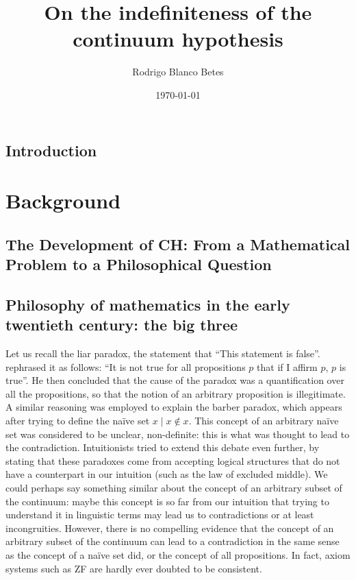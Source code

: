 \documentclass[11pt,a4paper]{book}
\title{\textbf{On the indefiniteness of the continuum hypothesis}}
\author{Rodrigo Blanco Betes}
\date{\today}
\begin{document}
\frontmatter
\maketitle

\tableofcontents

\section*{Introduction}


\mainmatter

\chapter{Background}

\section{The Development of CH: From a Mathematical Problem to a Philosophical Question}

\section{Philosophy of mathematics in the early twentieth century: the big three}
Let us recall the liar paradox, the statement that “This statement is false”. \textcite{Russell1908} rephrased it as follows: “It is not true for all propositions $p$ that if I affirm $p$, $p$ is true”. He then concluded that the cause of the paradox was a quantification over all the propositions, so that the notion of an arbitrary proposition is illegitimate. A similar reasoning was employed to explain the barber paradox, which appears after trying to define the naïve set ${x \mid x \notin x}$. This concept of an arbitrary naïve set was considered to be unclear, non-definite: this is what was thought to lead to the contradiction. Intuitionists tried to extend this debate even further, by stating that these paradoxes come from accepting logical structures that do not have a counterpart in our intuition (such as the law of excluded middle). We could perhaps say something similar about the concept of an arbitrary subset of the continuum: maybe this concept is so far from our intuition that trying to understand it in linguistic terms may lead us to contradictions or at least incongruities. However, there is no compelling evidence that the concept of an arbitrary subset of the continuum can lead to a contradiction in the same sense as the concept of a naïve set did, or the concept of all propositions. In fact, axiom systems such as ZF are hardly ever doubted to be consistent.
\end{document}
